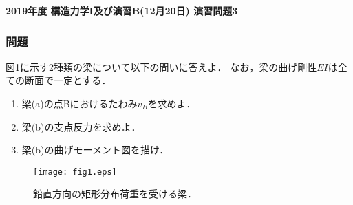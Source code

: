 \documentclass[10pt,a4j]{jarticle}
\newlength{\minitwocolumn}
\begin{document}
\newcommand{\fat}[1]{\mbox{\boldmath $#1$}}
\newcommand{\D}{\partial}
\newcommand{\w}{\omega}
\newcommand{\ga}{\alpha}
\newcommand{\gb}{\beta}
\newcommand{\gx}{\xi}
\newcommand{\gz}{\zeta}
\newcommand{\vhat}[1]{\hat{\fat{#1}}}
\newcommand{\spc}{\vspace{0.7\baselineskip}}
\newcommand{\halfspc}{\vspace{0.3\baselineskip}}

\pagestyle{empty}
\newcommand{\twofig}[2]
 {
   \begin{figure}[h]
     \begin{minipage}[t]{\minitwocolumn}
         \begin{center}   #1
         \end{center}
     \end{minipage}
         \hspace{\columnsep}
     \begin{minipage}[t]{\minitwocolumn}
         \begin{center} #2
         \end{center}
     \end{minipage}
   \end{figure}
 }
\begin{center}
{\Large \bf 2019年度 構造力学I及び演習B(12月20日) 演習問題3} \\
\end{center}
\subsubsection*{問題}
図\ref{fig:fig1}に示す2種類の梁について以下の問いに答えよ．
なお，梁の曲げ剛性$EI$は全ての断面で一定とする．
\begin{enumerate}
\item
	梁(a)の点Bにおけるたわみ$v_B$を求めよ．
\item
    	梁(b)の支点反力を求めよ．
\item
	梁(b)の曲げモーメント図を描け．
\end{enumerate}
\begin{figure}[h]
	\begin{center}
	\texttt{[image: fig1.eps]} 
	\end{center}
	\caption{鉛直方向の矩形分布荷重を受ける梁．}
	\label{fig:fig1}
\end{figure}
\end{document}
